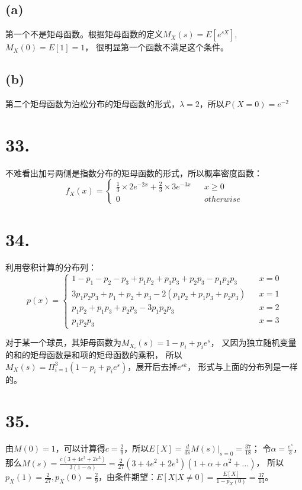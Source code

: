 \documentclass[UTF8]{report}
\begin{document}
        \subsection*{(a)}
            第一个不是矩母函数。根据矩母函数的定义$M_X(s) = E[e^{sX}]$,$M_X(0) = E[1] = 1$，
            很明显第一个函数不满足这个条件。
        \subsection*{(b)}
            第二个矩母函数为泊松分布的矩母函数的形式，$\lambda = 2$，所以$P(X = 0) = e^{-2}$
    \section*{33.}
        不难看出加号两侧是指数分布的矩母函数的形式，所以概率密度函数：
        $$f_X(x) = \left\{
            \begin{array}{lcr}
                \frac{1}{3} \times 2e^{-2x} + \frac{2}{3} \times 3e^{-3x} & & x \geq 0\\
                0 & & otherwise
            \end{array}
        \right.$$
    \section*{34.}
        利用卷积计算的分布列：
        $$p(x) = \left\{
            \begin{array}{lcr}
                1 - p_1 - p_2 - p_3 + p_1p_2 + p_1p_3 + p_2p_3 - p_1p_2p_3 & & x = 0\\
                3p_1p_2p_3 + p_1 + p_2 + p_3 - 2(p_1p_2 + p_1p_3 + p_2p_3) & & x = 1\\
                p_1p_2 + p_1p_3 + p_2p_3 - 3p_1p_2p_3 & & x = 2\\
                p_1p_2p_3 & & x = 3
            \end{array}
        \right.$$

        对于某一个球员，其矩母函数为$M_{X_i}(s) = 1 - p_i + p_ie^s$，
        又因为独立随机变量的和的矩母函数是和项的矩母函数的乘积，
        所以$M_X(s) = \Pi_{i = 1}^{3}(1 - p_i + p_ie^s)$，展开后去掉$e^{sk}$，
        形式与上面的分布列是一样的。
    \section*{35.}
        由$M(0) = 1$，可以计算得$c = \frac{2}{9}$，所以$E[X] = \frac{d}{ds}M(s)|_{s = 0} = \frac{37}{18}$；
        令$\alpha = \frac{e^s}{3}$，那么$M(s) = \frac{c(3 + 4e^2 + 2e^3)}{3(1 - \alpha)} = \frac{2}{27}(3 + 4e^2 + 2e^3)(1 + \alpha + \alpha^2 + \dots)$，
        所以$p_X(1) = \frac{2}{27}, p_X(0) = \frac{2}{9}$，由条件期望：$E[X|X \ne 0] = \frac{E[X]}{1 - p_X(0)} = \frac{37}{14}$。
\end{document}
